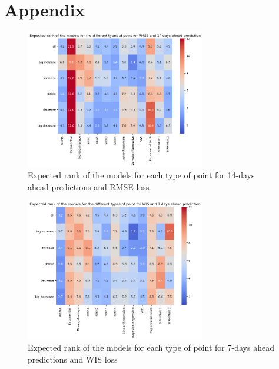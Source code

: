 \section{Appendix}
\label{sec:appendix}



\begin{figure}[H]
    \centering
    \includegraphics[width=0.7\textwidth]{figures/heatmap_RMSE_14.png}
    \caption{Expected rank of the models for each type of point for 14-days ahead predictions and RMSE loss}
    \label{fig:heatmap_RMSE_14}
\end{figure}

\begin{figure}[H]
    \centering
    \includegraphics[width=0.7\textwidth]{figures/heatmap_WIS_7.png}
    \caption{Expected rank of the models for each type of point for 7-days ahead predictions and WIS loss}
    \label{fig:heatmap_WIS_7}
\end{figure}


